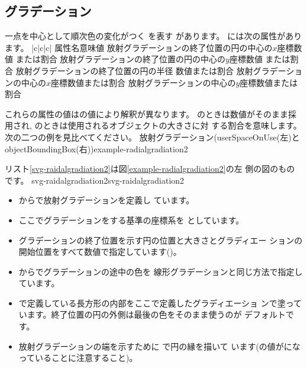 \subsection{グラデーション}
一点を中心として順次色の変化がつく
を表す
があります。
%
には次の属性があります。
{|c|c|c|}{%
{属性名}{意味}{値}
{}{放射グラデーションの終了位置の円の中心の$x$座標}{数値
または割合}
{}{放射グラデーションの終了位置の円の中心の$y$座標}{数値
または割合}
{}{放射グラデーションの終了位置の円の半径 }{数値または割合}
{}{放射グラデーションの中心の$x$座標}{数値または割合}
{}{放射グラデーションの中心の$y$座標}{数値または割合}}

これらの属性の値はの値により解釈が異なります。
のときは数値がそのまま採用され, 
のときは使用されるオブジェクトの大きさに対
する割合を意味します。次の二つの例を見比べてください。
    {放射グラデーション(userSpaceOnUse(左)とobjectBoundingBox(右))}{example-radialgradiation2}

リスト\ref{svg-raidalgradiation2}は図\ref{example-radialgradiation2}の左
側の図のものです。
  {svg-raidalgradiation2}{svg-raidalgradiation2}
\begin{itemize}
 \item {}からで放射グラデーションを定義し
       ています。
 \item ここでグラデーションをする基準の座標系を
       としています。
 \item グラデーションの終了位置を示す円の位置と大きさとグラディエー
       ションの開始位置をすべて数値で指定しています()。
 \item {}からでグラデーションの途中の色を
       線形グラデーションと同じ方法で指定しています。
 \item {}で定義している長方形の内部をここで定義したグラディエーショ
       ンで塗っています。終了位置の円の外側は最後の色をそのまま使うのが
       デフォルトです。
 \item 放射グラデーションの端を示すために
で円の縁を描いて
います(の値がになっていることに注意すること)。

\end{itemize}

